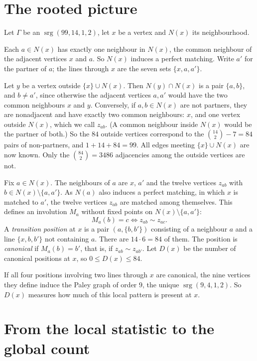 \documentclass[11pt]{amsart}
\theoremstyle{remark}
\newcommand{\srg}{\operatorname{srg}}
\begin{document}
\section{The rooted picture}\label{sec:rooted}

Let $\Gamma$ be an $\srg(99,14,1,2)$, let $x$ be a vertex and $N(x)$ its
neighbourhood.

Each $a\in N(x)$ has exactly one neighbour in $N(x)$, the common neighbour of
the adjacent vertices $x$ and $a$. So $N(x)$ induces a perfect matching. Write
$a'$ for the partner of $a$; the lines through $x$ are the seven sets
$\{x,a,a'\}$.

Let $y$ be a vertex outside $\{x\}\cup N(x)$. Then $N(y)\cap N(x)$ is a pair
$\{a,b\}$, and $b\ne a'$, since otherwise the adjacent vertices $a,a'$ would
have the two common neighbours $x$ and $y$. Conversely, if $a,b\in N(x)$ are
not partners, they are nonadjacent and have exactly two common neighbours:
$x$, and one vertex outside $N(x)$, which we call $z_{ab}$. (A common
neighbour inside $N(x)$ would be the partner of both.) So the $84$
outside vertices correspond to the $\binom{14}{2}-7=84$ pairs of non-partners,
and $1+14+84=99$. All edges meeting $\{x\}\cup N(x)$ are now known. Only the
$\binom{84}{2}=3486$ adjacencies among the outside vertices are not.

Fix $a\in N(x)$. The neighbours of $a$ are $x$, $a'$ and the twelve vertices
$z_{ab}$ with $b\in N(x)\setminus\{a,a'\}$. As $N(a)$ also induces a perfect
matching, in which $x$ is matched to $a'$, the twelve vertices $z_{ab}$ are
matched among themselves. This defines an involution $M_a$ without fixed
points on $N(x)\setminus\{a,a'\}$:
\[
  M_a(b)=c \iff z_{ab}\sim z_{ac}.
\]
A \emph{transition position} at $x$ is a pair $(a,\{b,b'\})$ consisting of a
neighbour $a$ and a line $\{x,b,b'\}$ not containing $a$. There are
$14\cdot6=84$ of them. The position is \emph{canonical} if $M_a(b)=b'$, that
is, if $z_{ab}\sim z_{ab'}$. Let $D(x)$ be the number of canonical positions
at $x$, so $0\le D(x)\le84$.

If all four positions involving two lines through $x$ are canonical, the nine
vertices they define induce the Paley graph of order $9$, the unique
$\srg(9,4,1,2)$. So $D(x)$ measures how much of this local pattern is present
at $x$.

\section{From the local statistic to the global count}\label{sec:counting}
\end{document}
